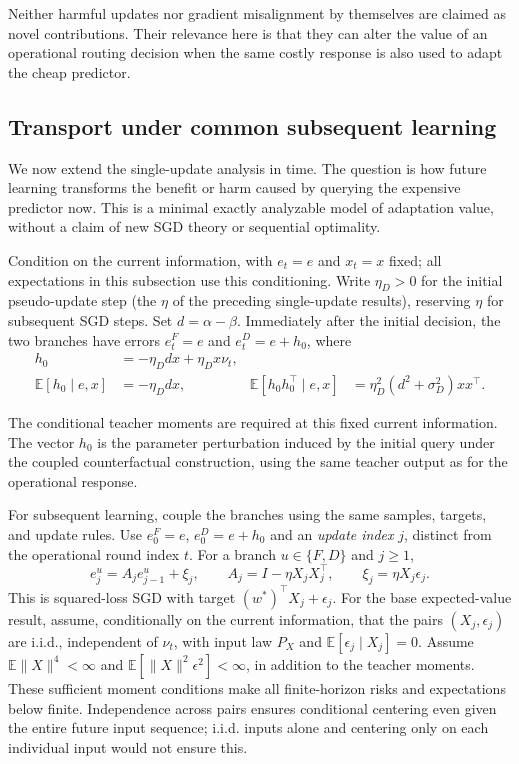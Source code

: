 Neither harmful updates nor gradient misalignment by themselves are claimed
as novel contributions. Their relevance here is that they can alter the
value of an operational routing decision when the same costly response is
also used to adapt the cheap predictor.

\subsection{Transport under common subsequent learning}
\label{sec:transport}

We now extend the single-update analysis in time. The question is how
future learning transforms the benefit or harm caused by querying the
expensive predictor now. This is a minimal exactly analyzable model of
adaptation value, without a claim of new SGD theory or sequential optimality.

Condition on the current information, with $e_t=e$ and $x_t=x$ fixed;
all expectations in this subsection use this conditioning. Write
$\eta_D>0$ for the initial pseudo-update step (the $\eta$ of the preceding
single-update results), reserving $\eta$ for subsequent SGD steps. Set
$d=\alpha-\beta$. Immediately after the initial decision, the two branches
have errors $e_t^F=e$ and $e_t^D=e+h_0$, where
\begin{align}
    h_0&=-\eta_D d x+\eta_D x\nu_t,\\
    \mathbb E[h_0\mid e,x]&=-\eta_D d x, &
    \mathbb E[h_0h_0^\top\mid e,x]
    &=\eta_D^2(d^2+\sigma_D^2)xx^\top.
\end{align}

The conditional teacher moments are required at this fixed current
information. The vector $h_0$ is the parameter perturbation induced by
the initial query under the coupled counterfactual construction, using
the same teacher output as for the operational response.

For subsequent learning, couple the branches using the same samples,
targets, and update rules. Use $e_0^F=e$, $e_0^D=e+h_0$ and an
\emph{update index} $j$, distinct from the operational round index $t$.
For a branch $u\in\{F,D\}$ and $j\geq1$,
\begin{equation}
    e_j^u=A_j e_{j-1}^u+\xi_j,\qquad
    A_j=I-\eta X_jX_j^\top,\qquad
    \xi_j=\eta X_j\epsilon_j.
    \label{eq:common-sgd}
\end{equation}
This is squared-loss SGD with target $(w^*)^\top X_j+\epsilon_j$.
For the base expected-value result, assume, conditionally on the current
information, that the pairs $(X_j,\epsilon_j)$ are i.i.d., independent of
$\nu_t$, with input law $P_X$ and $\mathbb E[\epsilon_j\mid X_j]=0$.
Assume $\mathbb E\|X\|^4<\infty$ and
$\mathbb E[\|X\|^2\epsilon^2]<\infty$, in addition to the teacher moments.
These sufficient moment conditions make all finite-horizon risks and
expectations below finite. Independence across pairs ensures conditional
centering even given the entire future input sequence; i.i.d. inputs alone
and centering only on each individual input would not ensure this.

